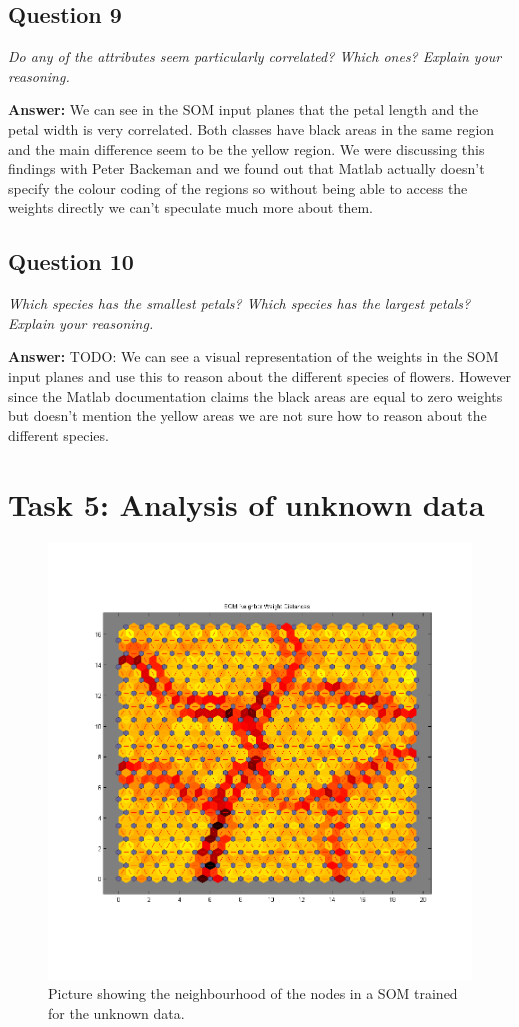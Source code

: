 \documentclass[a4paper]{article}
\begin{document}
\subsection*{Question 9}
\emph{Do any of the attributes seem particularly correlated? Which
ones? Explain your reasoning.}

\textbf{Answer:}  We can see in the SOM input planes that the petal length and the petal width is very correlated. Both classes have black areas in the same region and the main difference seem to be the yellow region. We were discussing this findings with Peter Backeman and we found out that Matlab actually doesn't specify the colour coding of the regions so without being able to access the weights directly we can't speculate much more about them. 

\subsection*{Question 10}
\emph{Which species has the smallest petals? Which species has the
largest petals? Explain your reasoning.}

\textbf{Answer:} TODO: We can see a visual representation of the weights in the SOM input planes and use this to reason about the different species of flowers. However since the Matlab documentation claims the black areas are equal to zero weights but doesn't mention the yellow areas we are not sure how to reason about the different species. 

\section*{Task 5: Analysis of unknown data}

 \begin{figure}[H] %
	 \includegraphics[scale=0.6]{20x20trainedUnknown.png}
	 \caption{\label{fig:20x20trainedUnknown} Picture showing the neighbourhood of the nodes in a SOM trained for the unknown data.}
 \end{figure}
\end{document}
